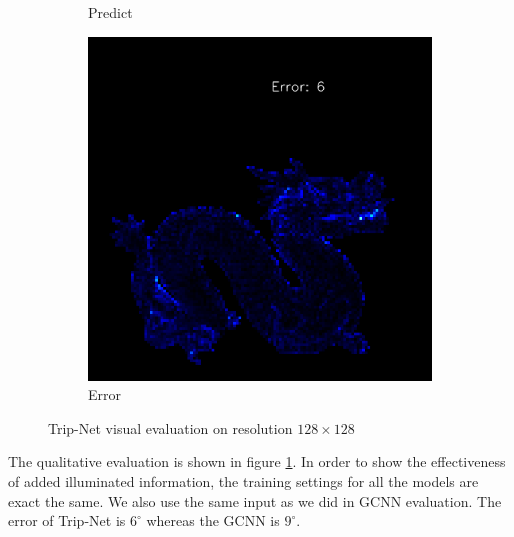 \begin{figure}[H]
\begin{subfigure}[b]{0.24\linewidth}
		\caption{Predict}
	\end{subfigure}
	\begin{subfigure}[b]{0.24\linewidth}
		\includegraphics[width=\linewidth]{./Figures/gcnn_synthetic/fancy_eval_7_error_an2-8-1000.png}
		\caption{Error}
	\end{subfigure}
	
	\decoRule
	\caption{Trip-Net visual evaluation on resolution $ 128\times128 $}
	\label{fig:trip-eval}
\end{figure}



The qualitative evaluation is shown in figure \ref{fig:trip-eval}. In order to show the effectiveness of added illuminated information, the training settings for all the models are exact the same. We also use the same input as we did in GCNN evaluation. The error of Trip-Net is $ 6^\circ $ whereas the GCNN is $ 9^\circ $. 


